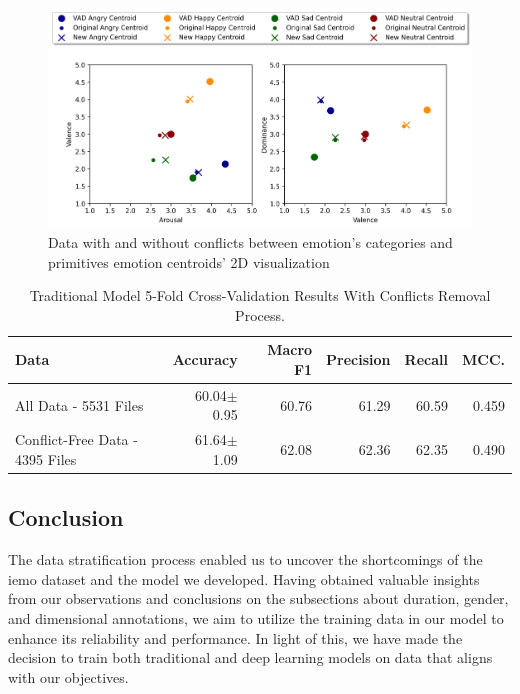 \begin{figure}[H]
  \centering
  \includegraphics[width=.9\linewidth]{figs/5_data_stratification/strict_conflicts_centroids_2d.png}
  \caption{Data with and without conflicts between emotion's categories and primitives emotion centroids' 2D visualization}
  \label{fig:signalWP}
\end{figure}



\begin{table}[H]
	\small
	\centering
	\caption{Traditional Model 5-Fold Cross-Validation Results With Conflicts Removal Process.}
	\label{tab:emo_cat2}
	\centering
	\begin{tabular}{lrrrrr}
		\toprule
		Data   						 	& Accuracy    & Macro F1    & Precision   & Recall      & MCC.       \\
		\midrule
		All Data - 5531 Files		 	& 60.04$\pm$0.95 & 60.76 & 61.29 & 60.59 & 0.459 \\
		Conflict-Free Data - 4395 Files & 61.64$\pm$1.09 & 62.08 & 62.36 & 62.35 & 0.490 \\
		\bottomrule
	\end{tabular}
\end{table}


\subsection{Conclusion}

The data stratification process enabled us to uncover the shortcomings of the \ac{iemo} dataset and the model we developed. Having obtained valuable insights from our observations and conclusions on the subsections about duration, gender, and dimensional annotations, we aim to utilize the training data in our model to enhance its reliability and performance. In light of this, we have made the decision to train both traditional and deep learning models on data that aligns with our objectives.

